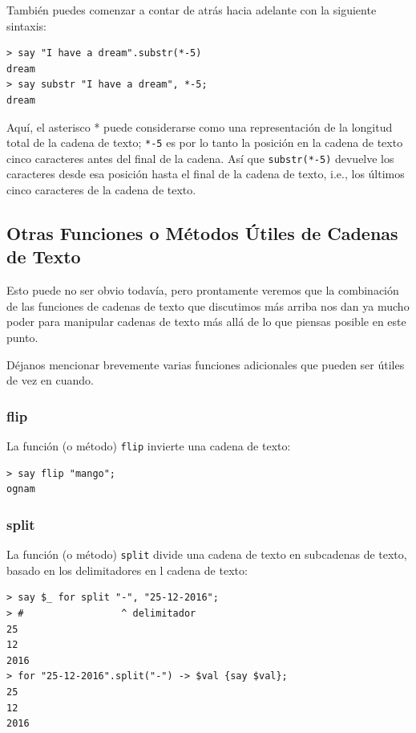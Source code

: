 También puedes comenzar a contar de atrás hacia adelante con la
siguiente sintaxis:

\begin{verbatim}
> say "I have a dream".substr(*-5)
dream
> say substr "I have a dream", *-5;
dream
\end{verbatim}
%
Aquí, el asterisco * puede considerarse como una representación de la
longitud total de la cadena de texto; \verb|*-5| es por lo tanto la posición
en la cadena de texto cinco caracteres antes del final de la cadena. Así que
\verb|substr(*-5)| devuelve los caracteres desde esa posición hasta el final
de la cadena de texto, i.e., los últimos cinco caracteres de la cadena de
texto.

\subsection{Otras Funciones o Métodos Útiles de Cadenas de Texto}

Esto puede no ser obvio todavía, pero prontamente veremos
que la combinación de las funciones de cadenas de texto que discutimos
más arriba nos dan ya mucho poder para manipular cadenas de texto
más allá de lo que piensas posible en este punto.

Déjanos mencionar brevemente varias funciones adicionales
que pueden ser útiles de vez en cuando.

\subsubsection{flip}

La función (o método) {\tt flip} invierte una cadena de texto:

\begin{verbatim}
> say flip "mango";
ognam
\end{verbatim}
%

\subsubsection{split}
La función (o método) {\tt split} divide una cadena de texto 
en subcadenas de texto, basado en los delimitadores en l
cadena de texto:

\begin{verbatim}
> say $_ for split "-", "25-12-2016";
> #                 ^ delimitador
25
12
2016
> for "25-12-2016".split("-") -> $val {say $val};
25
12
2016
\end{verbatim}

